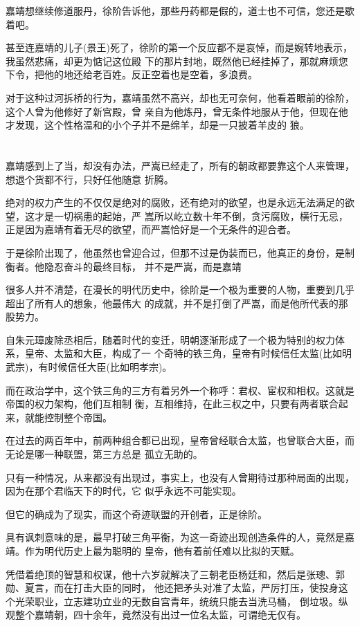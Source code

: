 \documentclass[11pt,a4paper,onecolumn]{article}
\begin{document}
嘉靖想继续修道服丹，徐阶告诉他，那些丹药都是假的，道士也不可信，您还是歇着吧。

甚至连嘉靖的儿子(景王)死了，徐阶的第一个反应都不是哀悼，而是婉转地表示，我虽然悲痛，却更为惦记这位殿
下的那片封地，既然他已经挂掉了，那就麻烦您下令，把他的地还给老百姓。反正空着也是空着，多浪费。

对于这种过河拆桥的行为，嘉靖虽然不高兴，却也无可奈何，他看着眼前的徐阶，这个人曾为他修好了新宫殿，曾
亲自为他炼丹，曾无条件地服从于他，但现在他才发现，这个性格温和的小个子并不是绵羊，却是一只披着羊皮的
狼。

\section[\thesection]{}

嘉靖感到上了当，却没有办法，严嵩已经走了，所有的朝政都要靠这个人来管理，想退个货都不行，只好任他随意
折腾。

绝对的权力产生的不仅仅是绝对的腐败，还有绝对的欲望，也是永远无法满足的欲望，这才是一切祸患的起始，严
嵩所以屹立数十年不倒，贪污腐败，横行无忌，正是因为嘉靖有着无尽的欲望，而严嵩恰好是一个无条件的迎合者。

于是徐阶出现了，他虽然也曾迎合过，但那不过是伪装而已，他真正的身份，是制衡者。他隐忍奋斗的最终目标，
并不是严嵩，而是嘉靖

很多人并不清楚，在漫长的明代历史中，徐阶是一个极为重要的人物，重要到几乎超出了所有人的想象，他最伟大
的成就，并不是打倒了严嵩，而是他所代表的那股势力。

自朱元璋废除丞相后，随着时代的变迁，明朝逐渐形成了一个极为特别的权力体系，皇帝、太监和大臣，构成了一
个奇特的铁三角，皇帝有时候信任太监(比如明武宗)，有时候信任大臣(比如明孝宗)。

而在政治学中，这个铁三角的三方有着另外一个称呼：君权、宦权和相权。这就是帝国的权力架构，他们互相制
衡，互相维持，在此三权之中，只要有两者联合起来，就能控制整个帝国。

在过去的两百年中，前两种组合都已出现，皇帝曾经联合太监，也曾联合大臣，而无论是哪一种联盟，第三方总是
孤立无助的。

只有一种情况，从来都没有出现过，事实上，也没有人曾期待过那种局面的出现，因为在那个君临天下的时代，它
似乎永远不可能实现。

但它的确成为了现实，而这个奇迹联盟的开创者，正是徐阶。

具有讽刺意味的是，最早打破三角平衡，为这一奇迹出现创造条件的人，竟然是嘉靖。作为明代历史上最为聪明的
皇帝，他有着前任难以比拟的天赋。

凭借着绝顶的智慧和权谋，他十六岁就解决了三朝老臣杨廷和，然后是张璁、郭勋、夏言，而在打击大臣的同时，
他还把矛头对准了太监，严厉打压，使投身这个光荣职业，立志建功立业的无数自宫青年，统统只能去当洗马桶，
倒垃圾。纵观整个嘉靖朝，四十余年，竟然没有出过一位名太监，可谓绝无仅有。
\end{document}
